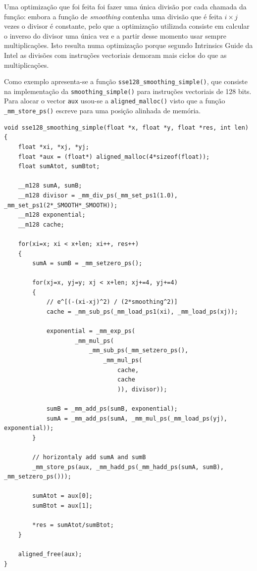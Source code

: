 \documentclass[a4paper]{article}
\begin{document}
	Uma optimização que foi feita foi fazer uma única divisão por cada chamada da função: embora a função de \textit{smoothing} contenha uma divisão que é feita $i \times j$ vezes o divisor é constante, pelo que a optimização utilizada consiste em calcular o inverso do divisor uma única vez e a partir desse momento usar sempre multiplicações. Isto resulta numa optimização porque segundo Intrinsics Guide da Intel as divisões com instruções vectoriais demoram mais ciclos do que as multiplicações.
	
	Como exemplo apresenta-se a função \texttt{sse128\_smoothing\_simple()}, que consiste na implementação da \texttt{smoothing\_simple()} para instruções vectoriais de 128 bits. Para alocar o vector \texttt{aux} usou-se a \texttt{aligned\_malloc()} visto que a função \texttt{\_mm\_store\_ps()} escreve para uma posição alinhada de memória.
	
	\begin{verbatim}
void sse128_smoothing_simple(float *x, float *y, float *res, int len) {
    float *xi, *xj, *yj;
    float *aux = (float*) aligned_malloc(4*sizeof(float));
    float sumAtot, sumBtot;

    __m128 sumA, sumB;
    __m128 divisor = _mm_div_ps(_mm_set_ps1(1.0), _mm_set_ps1(2*_SMOOTH*_SMOOTH));
    __m128 exponential;
    __m128 cache;

    for(xi=x; xi < x+len; xi++, res++)
    {
        sumA = sumB = _mm_setzero_ps();

        for(xj=x, yj=y; xj < x+len; xj+=4, yj+=4)
        {
            // e^[(-(xi-xj)^2) / (2*smoothing^2)]
            cache = _mm_sub_ps(_mm_load_ps1(xi), _mm_load_ps(xj));
            
            exponential = _mm_exp_ps(
                    _mm_mul_ps(
                        _mm_sub_ps(_mm_setzero_ps(),
                            _mm_mul_ps(
                                cache,
                                cache
                                )), divisor));

            sumB = _mm_add_ps(sumB, exponential);
            sumA = _mm_add_ps(sumA, _mm_mul_ps(_mm_load_ps(yj), exponential));
        }

        // horizontaly add sumA and sumB
        _mm_store_ps(aux, _mm_hadd_ps(_mm_hadd_ps(sumA, sumB), _mm_setzero_ps()));

        sumAtot = aux[0];
        sumBtot = aux[1];

        *res = sumAtot/sumBtot;
    }

    aligned_free(aux);
}
	\end{verbatim}		
\end{document}
